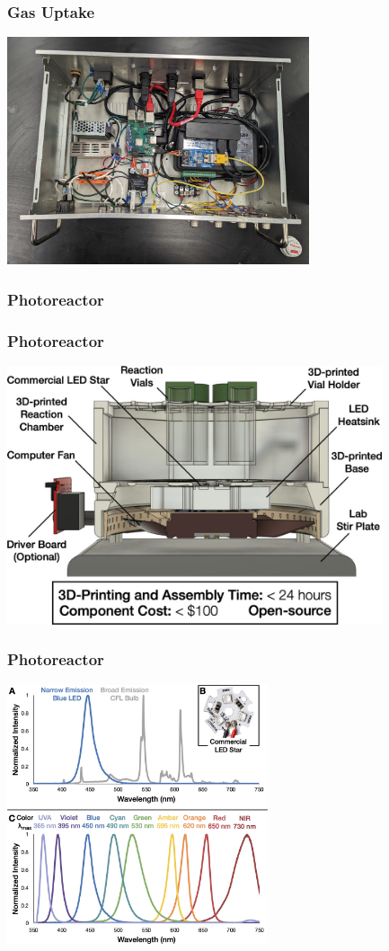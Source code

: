 \documentclass{presentation}
\begin{document}
\begin{frame}\frametitle{Gas Uptake}
  \centering
  \includegraphics[width=3.5in]{"./PXL_20240213_224236028.jpg"}
\end{frame}

\begin{frame}\frametitle{Photoreactor}
\end{frame}

\begin{frame}\frametitle{Photoreactor}
  \centering
  \includegraphics[height=3in]{"./images_large_ol1c01910_0001.jpeg"}
\end{frame}

\begin{frame}\frametitle{Photoreactor}
  \centering
  \includegraphics[height=3in]{"./images_large_ol1c01910_0002.jpeg"}
\end{frame}
\end{document}
